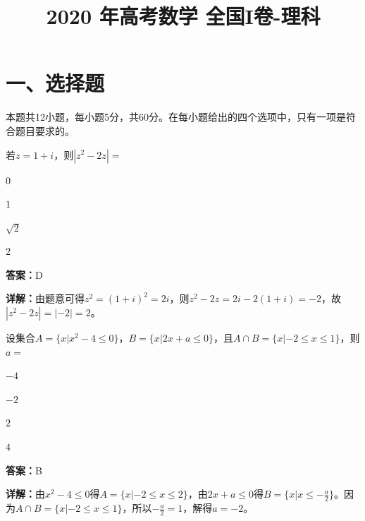 ﻿\title{2020 年高考数学 全国I卷-理科}
\date{}
\maketitle

\section*{一、选择题}
本题共12小题，每小题5分，共60分。在每小题给出的四个选项中，只有一项是符合题目要求的。

\begin{question}[points=5]
若$z=1+i$，则$|z^2-2z|=$
\begin{choices}
  \item $0$
  \item $1$
  \item $\sqrt{2}$
  \item $2$
\end{choices}
\begin{solution}
\textbf{答案：}D

\textbf{详解：}由题意可得$z^2=(1+i)^2=2i$，则$z^2-2z=2i-2(1+i)=-2$，故$|z^2-2z|=|-2|=2$。
\end{solution}
\end{question}

\begin{question}[points=5]
设集合$A=\{x|x^2-4\leq 0\}$，$B=\{x|2x+a\leq 0\}$，且$A\cap B=\{x|-2\leq x\leq 1\}$，则$a=$
\begin{choices}
  \item $-4$
  \item $-2$
  \item $2$
  \item $4$
\end{choices}
\begin{solution}
\textbf{答案：}B

\textbf{详解：}由$x^2-4\leq 0$得$A=\{x|-2\leq x\leq 2\}$，由$2x+a\leq 0$得$B=\{x|x\leq -\frac{a}{2}\}$。因为$A\cap B=\{x|-2\leq x\leq 1\}$，所以$-\frac{a}{2}=1$，解得$a=-2$。
\end{solution}
\end{question}

